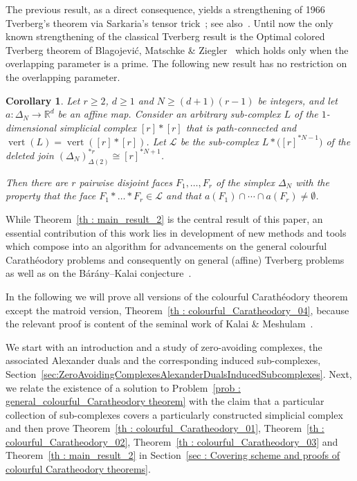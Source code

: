 \documentclass[a4paper,11pt,reqno, english]{amsart}
\newtheorem{corollary}[theorem]{Corollary}
\theoremstyle{definition}
\theoremstyle{remark}
\newcommand\R{\mathbb R}
\newcommand\LL{\mathscr{L}}
\DeclareMathOperator{\vertex}{\mathrm{vert}}
\begin{document}
\medskip
The previous result, as a direct consequence, yields a strengthening of 1966 Tverberg's theorem via Sarkaria's tensor trick~\cite{Sarkaria1992}; see also~\cite[Ch.\,13]{Barany2021}.
Until now the only known strengthening of the classical Tverberg result is the Optimal colored Tverberg theorem of Blagojevi\'c, Matschke \& Ziegler~\cite{Blagojevic2009,Blagojevic2011-2} which holds only when the overlapping parameter is a prime.
The following new result has no restriction on the overlapping parameter.

\medskip
\begin{corollary}
	\label{th : main_result_1}
	Let $r\geq 2$, $d\geq 1$ and $N\geq (d+1)(r-1)$	be integers, and let $a\colon \Delta_N\longrightarrow\R^d$ be an affine map.
	Consider an arbitrary sub-complex $L$ of the $1$-dimensional simplicial complex $[r]*[r]$ that is path-connected and $\vertex(L)=\vertex([r]*[r])$.
	Let $\LL$ be the sub-complex $L*\big([r]^{* N-1}\big)$ of the deleted join $(\Delta_N)^{*r}_{\Delta(2)}\cong [r]^{* N+1}$.

	\smallskip\noindent
	Then there are $r$ pairwise disjoint faces $F_1,\dots, F_r$ of the simplex $\Delta_N$ with the property that the face $F_1*\dots*F_r\in\LL$ and that $a(F_1)\cap\cdots\cap a(F_r)\neq\emptyset$.
\end{corollary}

\medskip
While Theorem~\ref{th : main_result_2} is the central result of this paper, an essential contribution of this work lies in development of new methods and tools which compose into an algorithm for advancements on the general colourful Carath\'eodory problems and consequently on general (affine) Tverberg problems as well as on the B\'ar\'any--Kalai conjecture~\cite[Conj.\,4.5]{BaranyKalai2022}.

\medskip
In the following we will prove all versions of the colourful Carath\'eodory theorem except the matroid version, Theorem~\ref{th : colourful_Caratheodory_04}, because the relevant proof is content of the seminal work of Kalai \& Meshulam~\cite[Cor.\,1.4]{KalaiMeshulam2005}.

\medskip
We start with an introduction and a study of zero-avoiding complexes, the associated Alexander duals and the corresponding induced sub-complexes, Section~\ref{sec:ZeroAvoidingComplexesAlexanderDualsInducedSubcomplexes}.
Next, we relate the existence of a solution to Problem~\ref{prob : general_colourful_Caratheodory theorem} with the claim that a particular collection of sub-complexes covers a particularly constructed simplicial complex and then prove Theorem~\ref{th : colourful_Caratheodory_01}, Theorem~\ref{th : colourful_Caratheodory_02}, Theorem~\ref{th : colourful_Caratheodory_03} and Theorem~\ref{th : main_result_2} in Section~\ref{sec : Covering scheme and proofs of colourful Caratheodory theorems}.
\end{document}

